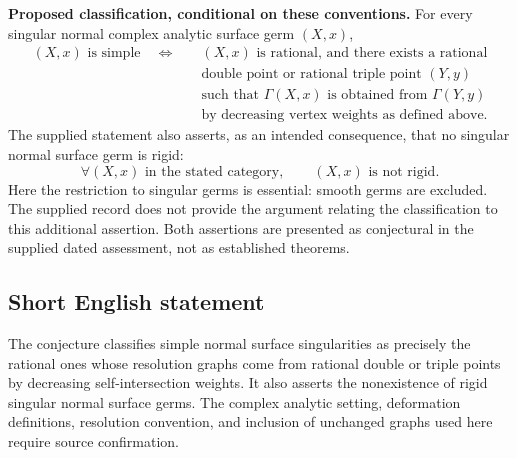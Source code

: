 \documentclass[11pt]{article}
\begin{document}
\textbf{Proposed classification, conditional on these conventions.} For every singular normal complex analytic surface germ $(X,x)$,
\[
\begin{aligned}
 (X,x)\text{ is simple}
 \quad\Longleftrightarrow\quad& (X,x)\text{ is rational, and there exists a rational}\\
 &\text{double point or rational triple point }(Y,y)\\
 &\text{such that }\Gamma(X,x)\text{ is obtained from }\Gamma(Y,y)\\
 &\text{by decreasing vertex weights as defined above.}
\end{aligned}
\]
The supplied statement also asserts, as an intended consequence, that no singular normal surface germ is rigid:
\[
 \forall (X,x)\text{ in the stated category},\qquad
 (X,x)\text{ is not rigid}.
\]
Here the restriction to singular germs is essential: smooth germs are excluded. The supplied record does not provide the argument relating the classification to this additional assertion. Both assertions are presented as conjectural in the supplied dated assessment, not as established theorems.
\subsection{Short English statement}
The conjecture classifies simple normal surface singularities as precisely the rational ones whose resolution graphs come from rational double or triple points by decreasing self-intersection weights. It also asserts the nonexistence of rigid singular normal surface germs. The complex analytic setting, deformation definitions, resolution convention, and inclusion of unchanged graphs used here require source confirmation.
\end{document}
